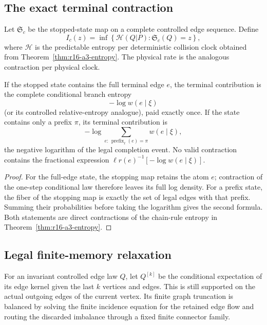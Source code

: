 \subsection{The exact terminal contraction}

Let \(\mathfrak S_c\) be the stopped-state map on a complete controlled edge
sequence.  Define
\[
 I_c(z)=\inf\left\{
  \mathcal H(Q|P):\mathfrak S_c(Q)=z
 \right\},
\]
where \(\mathcal H\) is the predictable entropy per deterministic collision
clock obtained from Theorem~\ref{thm:r16-a3-entropy}.  The physical rate is the
analogous contraction per physical clock.

\begin{lemma}
\label{lem:r16-a3-terminal}
If the stopped state contains the full terminal edge \(e\), the terminal
contribution is the complete conditional branch entropy
\[
 -\log w(e\mid\xi)
\]
(or its controlled relative-entropy analogue), paid exactly once.  If the
state contains only a prefix \(\pi\), its terminal contribution is
\[
 -\log\sum_{e:\,\operatorname{prefix}_{\ell}(e)=\pi}
       w(e\mid\xi),
\]
the negative logarithm of the legal completion event.  No valid contraction
contains the fractional expression
\(\ell r(e)^{-1}[-\log w(e\mid\xi)]\).
\end{lemma}

\begin{proof}
For the full-edge state, the stopping map retains the atom \(e\); contraction
of the one-step conditional law therefore leaves its full log density.  For a
prefix state, the fiber of the stopping map is exactly the set of legal edges
with that prefix.  Summing their probabilities before taking the logarithm
gives the second formula.  Both statements are direct contractions of the
chain-rule entropy in Theorem~\ref{thm:r16-a3-entropy}.
\end{proof}

\subsection{Legal finite-memory relaxation}

For an invariant controlled edge law \(Q\), let \(Q^{[k]}\) be the conditional
expectation of its edge kernel given the last \(k\) vertices and edges.  This is
still supported on the actual outgoing edges of the current vertex.  Its
finite graph truncation is balanced by solving the finite incidence equation
for the retained edge flow and routing the discarded imbalance through a
fixed finite connector family.

